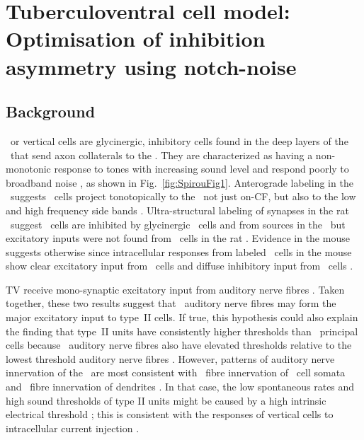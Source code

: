 \section[TV Cell Model]{Tuberculoventral cell model: Optimisation of inhibition asymmetry using notch-noise} \label{sec:TV-cell-model}

\subsection{Background}

\TV~or vertical cells are glycinergic, inhibitory cells found in the deep layers of the \DCN~that send axon collaterals to the \VCN\@.
They are characterized as having a non-monotonic response to tones with increasing sound level and respond poorly to broadband noise \citep{SpirouDavisEtAl:1999,NelkenYoung:1997,ReissYoung:2005}, as shown in Fig.~\ref{fig:SpirouFig1}.
Anterograde labeling in the \DCN~suggests \TV~cells project tonotopically to the \VCN~not just on-CF, but also to the low and high frequency side bands \citep{MunirathinamOstapoffEtAl:2004,OstapoffMorestEtAl:1999}.
Ultra-structural labeling of synapses in the rat \DCN~suggest \TV~cells are inhibited by glycinergic \DS~cells and from sources in the \DCN~but excitatory inputs were not found      from \TS~cells in the rat \citep{Rubio:2005}.
Evidence in the mouse suggests otherwise since intracellular responses from labeled \TV~cells in the mouse show clear excitatory input from \TS~cells and diffuse inhibitory input from \DS~cells \citep{ZhangOertel:1993b,WickesbergOertel:1993}.


TV receive mono-synaptic excitatory input from auditory nerve fibres \citep{OertelWu:1989,ZhangOertel:1993b}.
Taken together, these two results suggest that \LSR~auditory nerve fibres may form the major excitatory input to type~II cells.
If true, this hypothesis could also explain the finding that type~II units have consistently higher thresholds than \DCN~principal cells \citep{YoungBrownell:1976} because \LSR~auditory nerve fibres also have elevated thresholds relative to the lowest threshold auditory nerve fibres \citep{Liberman:1978}.
However, patterns of auditory nerve innervation of the \DCN~are most consistent with \HSR~fibre innervation of \TV~cell somata and \LSR~fibre innervation of dendrites \citep{Liberman:1993}.
In that case, the low spontaneous rates and high sound thresholds of type II units might be caused by a high intrinsic electrical threshold \citep{HancockDavisEtAl:1997}; this is consistent with the responses of vertical cells to intracellular current injection \citep{DingVoigt:1997,ZhangOertel:1993b}.

